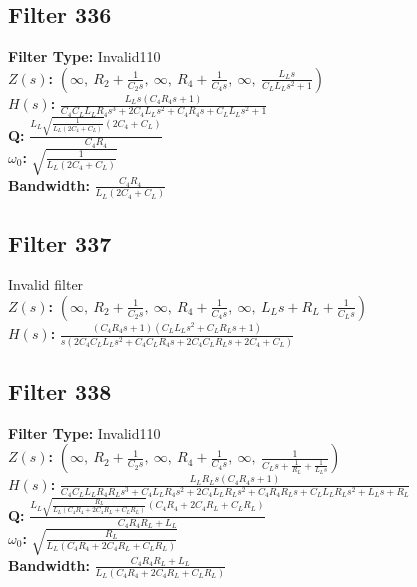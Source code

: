 \documentclass{article}
\begin{document}
\subsection*{Filter 336}
\textbf{Filter Type:} Invalid110 \\ 
\textbf{$Z(s)$:} $\left( \infty, \  R_{2} + \frac{1}{C_{2} s}, \  \infty, \  R_{4} + \frac{1}{C_{4} s}, \  \infty, \  \frac{L_{L} s}{C_{L} L_{L} s^{2} + 1}\right)$ \\ 
\textbf{$H(s)$:} $\frac{L_{L} s \left(C_{4} R_{4} s + 1\right)}{C_{4} C_{L} L_{L} R_{4} s^{3} + 2 C_{4} L_{L} s^{2} + C_{4} R_{4} s + C_{L} L_{L} s^{2} + 1}$ \\ 
\textbf{Q:} $\frac{L_{L} \sqrt{\frac{1}{L_{L} \left(2 C_{4} + C_{L}\right)}} \left(2 C_{4} + C_{L}\right)}{C_{4} R_{4}}$ \\ 
\textbf{$\omega_0$:} $\sqrt{\frac{1}{L_{L} \left(2 C_{4} + C_{L}\right)}}$ \\ 
\textbf{Bandwidth:} $\frac{C_{4} R_{4}}{L_{L} \left(2 C_{4} + C_{L}\right)}$ \\ 
\subsection*{Filter 337}
Invalid filter \\ 
\textbf{$Z(s)$:} $\left( \infty, \  R_{2} + \frac{1}{C_{2} s}, \  \infty, \  R_{4} + \frac{1}{C_{4} s}, \  \infty, \  L_{L} s + R_{L} + \frac{1}{C_{L} s}\right)$ \\ 
\textbf{$H(s)$:} $\frac{\left(C_{4} R_{4} s + 1\right) \left(C_{L} L_{L} s^{2} + C_{L} R_{L} s + 1\right)}{s \left(2 C_{4} C_{L} L_{L} s^{2} + C_{4} C_{L} R_{4} s + 2 C_{4} C_{L} R_{L} s + 2 C_{4} + C_{L}\right)}$ \\ 
\subsection*{Filter 338}
\textbf{Filter Type:} Invalid110 \\ 
\textbf{$Z(s)$:} $\left( \infty, \  R_{2} + \frac{1}{C_{2} s}, \  \infty, \  R_{4} + \frac{1}{C_{4} s}, \  \infty, \  \frac{1}{C_{L} s + \frac{1}{R_{L}} + \frac{1}{L_{L} s}}\right)$ \\ 
\textbf{$H(s)$:} $\frac{L_{L} R_{L} s \left(C_{4} R_{4} s + 1\right)}{C_{4} C_{L} L_{L} R_{4} R_{L} s^{3} + C_{4} L_{L} R_{4} s^{2} + 2 C_{4} L_{L} R_{L} s^{2} + C_{4} R_{4} R_{L} s + C_{L} L_{L} R_{L} s^{2} + L_{L} s + R_{L}}$ \\ 
\textbf{Q:} $\frac{L_{L} \sqrt{\frac{R_{L}}{L_{L} \left(C_{4} R_{4} + 2 C_{4} R_{L} + C_{L} R_{L}\right)}} \left(C_{4} R_{4} + 2 C_{4} R_{L} + C_{L} R_{L}\right)}{C_{4} R_{4} R_{L} + L_{L}}$ \\ 
\textbf{$\omega_0$:} $\sqrt{\frac{R_{L}}{L_{L} \left(C_{4} R_{4} + 2 C_{4} R_{L} + C_{L} R_{L}\right)}}$ \\ 
\textbf{Bandwidth:} $\frac{C_{4} R_{4} R_{L} + L_{L}}{L_{L} \left(C_{4} R_{4} + 2 C_{4} R_{L} + C_{L} R_{L}\right)}$ \\ 
\end{document}
